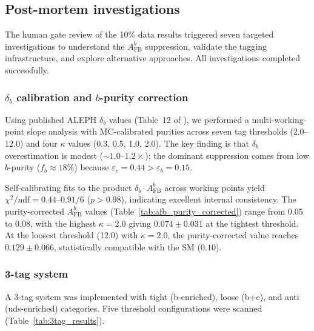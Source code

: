 \documentclass[11pt,a4paper]{article}
\begin{document}
\subsection{Post-mortem investigations}
\label{sec:postmortem}

The human gate review of the 10\% data results triggered seven targeted investigations
to understand the $A_\mathrm{FB}^b$ suppression, validate the tagging infrastructure,
and explore alternative approaches. All investigations completed successfully.

\subsubsection{$\delta_b$ calibration and $b$-purity correction}
\label{sec:postmortem_deltab}

Using published ALEPH $\delta_b$ values (Table~12 of \cite{ALEPH:AFBb}), we performed
a multi-working-point slope analysis with MC-calibrated purities across seven tag
thresholds (2.0--12.0) and four $\kappa$ values (0.3, 0.5, 1.0, 2.0). The key
finding is that $\delta_b$ overestimation is modest ($\sim 1.0$--$1.2\times$); the
dominant suppression comes from low $b$-purity ($f_b \approx 18\%$) because
$\varepsilon_c = 0.44 > \varepsilon_b = 0.15$.

Self-calibrating fits to the product $\delta_b \cdot A_\mathrm{FB}^b$ across
working points yield $\chi^2/\mathrm{ndf} = 0.44$--$0.91/6$ ($p > 0.98$),
indicating excellent internal consistency. The purity-corrected $A_\mathrm{FB}^b$
values (Table~\ref{tab:afb_purity_corrected}) range from 0.05 to 0.08, with the
highest $\kappa = 2.0$ giving $0.074 \pm 0.031$ at the tightest threshold.
At the loosest threshold (12.0) with $\kappa = 2.0$, the purity-corrected value
reaches $0.129 \pm 0.066$, statistically compatible with the SM ($0.10$).

\subsubsection{3-tag system}
\label{sec:postmortem_3tag}

A 3-tag system was implemented with tight (b-enriched), loose (b+c), and anti
(uds-enriched) categories. Five threshold configurations were scanned
(Table~\ref{tab:3tag_results}).
\end{document}
